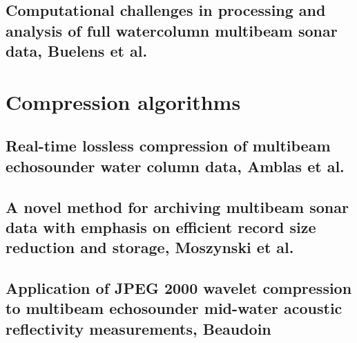 	\subsection{Computational challenges in processing and analysis of full watercolumn multibeam sonar data, Buelens et al.}
		

\section{Compression algorithms}
	\subsection{Real-time lossless compression of multibeam echosounder water column data, Amblas et al.}
		
	\subsection{A novel method for archiving multibeam sonar data with emphasis on efficient record size reduction and storage, Moszynski et al.}
    	
	\subsection{Application of {JPEG} 2000 wavelet compression to multibeam echosounder mid-water acoustic reflectivity measurements, Beaudoin}
    	

